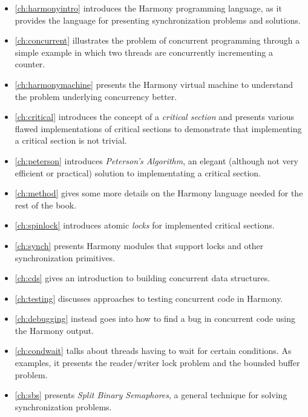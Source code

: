 \documentclass{report}
\begin{document}
\begin{itemize}
\item \autoref{ch:harmonyintro} introduces the Harmony programming
language, as it provides the language for presenting synchronization
problems and solutions.
\item \autoref{ch:concurrent} illustrates the problem of
concurrent programming through a simple example in which two threads
are concurrently incrementing a counter.
\item \autoref{ch:harmonymachine} presents the
Harmony virtual machine to understand the problem
underlying concurrency better.
\item \autoref{ch:critical} introduces the concept of a
\emph{critical section} and presents various flawed implementations
of critical sections to demonstrate that implementing a critical section
is not trivial.
\item \autoref{ch:peterson} introduces \emph{Peterson's Algorithm}, an
elegant (although not very efficient or practical) solution to implementating a critical section.
\item \autoref{ch:method} gives some more details on the Harmony
language needed for the rest of the book.
\item \autoref{ch:spinlock} introduces atomic \emph{locks}
for implemented critical sections.
\item \autoref{ch:synch} presents Harmony modules
that support locks and other synchronization primitives.
\item \autoref{ch:cds} gives an introduction to building concurrent
data structures.
\item \autoref{ch:testing} discusses approaches to testing
concurrent code in Harmony.
\item \autoref{ch:debugging} instead goes into how to find a bug
in concurrent code using the Harmony output.
\item \autoref{ch:condwait} talks about threads having to wait for
certain conditions.  As examples, it presents the reader/writer lock
problem and the bounded buffer problem.
\item \autoref{ch:sbs} presents \emph{Split Binary Semaphores}, a
general technique for solving synchronization problems.

\end{itemize}
\end{document}
